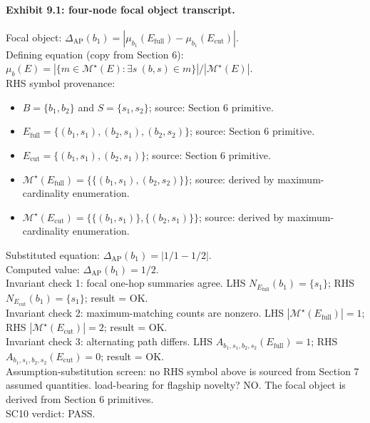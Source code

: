 \documentclass[11pt]{article}
\theoremstyle{definition}
\theoremstyle{plain}
\theoremstyle{remark}
\begin{document}
\paragraph{Exhibit 9.1: four-node focal object transcript.}
Focal object: $\Delta_{\mathrm{AP}}(b_1)=|\mu_{b_1}(E_{\mathrm{full}})-\mu_{b_1}(E_{\mathrm{cut}})|$.\\
Defining equation (copy from Section 6): $\mu_b(E)=|\{m\in\mathcal M^\star(E):\exists s\ (b,s)\in m\}|/|\mathcal M^\star(E)|$.\\
RHS symbol provenance:
\begin{itemize}[leftmargin=*]
\item $B=\{b_1,b_2\}$ and $S=\{s_1,s_2\}$; source: Section 6 primitive.
\item $E_{\mathrm{full}}=\{(b_1,s_1),(b_2,s_1),(b_2,s_2)\}$; source: Section 6 primitive.
\item $E_{\mathrm{cut}}=\{(b_1,s_1),(b_2,s_1)\}$; source: Section 6 primitive.
\item $\mathcal M^\star(E_{\mathrm{full}})=\{\{(b_1,s_1),(b_2,s_2)\}\}$; source: derived by maximum-cardinality enumeration.
\item $\mathcal M^\star(E_{\mathrm{cut}})=\{\{(b_1,s_1)\},\{(b_2,s_1)\}\}$; source: derived by maximum-cardinality enumeration.
\end{itemize}
Substituted equation: $\Delta_{\mathrm{AP}}(b_1)=|1/1-1/2|$.\\
Computed value: $\Delta_{\mathrm{AP}}(b_1)=1/2$.\\
Invariant check 1: focal one-hop summaries agree. LHS $N_{E_{\mathrm{full}}}(b_1)=\{s_1\}$; RHS $N_{E_{\mathrm{cut}}}(b_1)=\{s_1\}$; result = OK.\\
Invariant check 2: maximum-matching counts are nonzero. LHS $|\mathcal M^\star(E_{\mathrm{full}})|=1$; RHS $|\mathcal M^\star(E_{\mathrm{cut}})|=2$; result = OK.\\
Invariant check 3: alternating path differs. LHS $A_{b_1,s_1,b_2,s_2}(E_{\mathrm{full}})=1$; RHS $A_{b_1,s_1,b_2,s_2}(E_{\mathrm{cut}})=0$; result = OK.\\
Assumption-substitution screen: no RHS symbol above is sourced from Section 7 assumed quantities. load-bearing for flagship novelty? NO. The focal object is derived from Section 6 primitives.\\
SC10 verdict: PASS.
\end{document}

